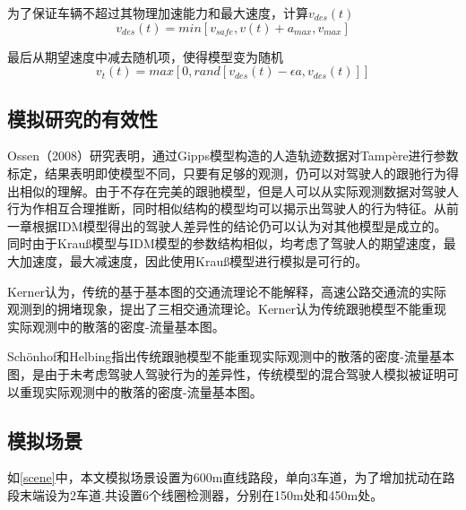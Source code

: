 为了保证车辆不超过其物理加速能力和最大速度，计算$v_{des}(t)$
\begin{equation}
v_{des}(t)=min[v_{safe},v(t)+a_{max},v_{max}]
\end{equation}

最后从期望速度中减去随机项，使得模型变为随机
\begin{equation}
v_{t}(t)=max[0,rand[v_{des}(t)-\epsilon a,v_{des}(t)]]
\end{equation}



\subsection{模拟研究的有效性}

Ossen（2008）\cite{Ossen2008}研究表明，通过Gipps模型构造的人造轨迹数据对Tampère进行参数标定，结果表明即使模型不同，只要有足够的观测，仍可以对驾驶人的跟驰行为得出相似的理解。由于不存在完美的跟驰模型，但是人可以从实际观测数据对驾驶人行为作相互合理推断，同时相似结构的模型均可以揭示出驾驶人的行为特征。从前一章根据IDM模型得出的驾驶人差异性的结论仍可以认为对其他模型是成立的。同时由于Krauß模型与IDM模型的参数结构相似，均考虑了驾驶人的期望速度，最大加速度，最大减速度，因此使用Krauß模型进行模拟是可行的。




Kerner\cite{S.Kerner2009}认为，传统的基于基本图的交通流理论不能解释，高速公路交通流的实际观测到的拥堵现象，提出了三相交通流理论。Kerner认为传统跟驰模型不能重现实际观测中的散落的密度-流量基本图。


Schönhof和Helbing\cite{Schoenhof2009}指出传统跟驰模型不能重现实际观测中的散落的密度-流量基本图，是由于未考虑驾驶人驾驶行为的差异性，传统模型的混合驾驶人模拟被证明可以重现实际观测中的散落的密度-流量基本图。



\subsection{模拟场景}


如\autoref{scene}中，本文模拟场景设置为600m直线路段，单向3车道，为了增加扰动在路段末端设为2车道.共设置6个线圈检测器，分别在150m处和450m处。

